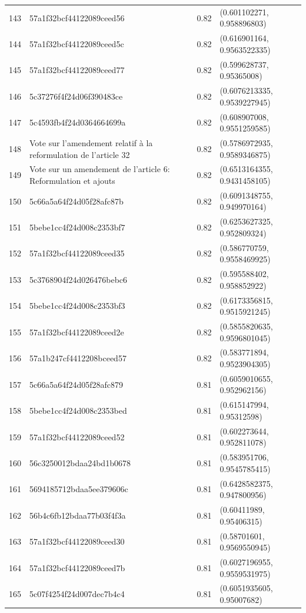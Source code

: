 \begin{table}[ht]
\begin{tabular}{rlrl}
  143 & 57a1f32bcf44122089ceed56 & 0.82 & (0.601102271, 0.958896803) \\ 
  144 & 57a1f32bcf44122089ceed5c & 0.82 & (0.616901164, 0.9563522335) \\ 
  145 & 57a1f32bcf44122089ceed77 & 0.82 & (0.599628737, 0.95365008) \\ 
  146 & 5c37276f4f24d06f390483ce & 0.82 & (0.6076213335, 0.9539227945) \\ 
  147 & 5c4593fb4f24d0364664699a & 0.82 & (0.608907008, 0.9551259585) \\ 
  148 & Vote sur l'amendement relatif à la reformulation de l'article 32 & 0.82 & (0.5786972935, 0.9589346875) \\ 
  149 & Vote sur un amendement de l'article 6: Reformulation et ajouts & 0.82 & (0.6513164355, 0.9431458105) \\ 
  150 & 5c66a5a64f24d05f28afc87b & 0.82 & (0.6091348755, 0.949970164) \\ 
  151 & 5bebe1cc4f24d008c2353bf7 & 0.82 & (0.6253627325, 0.952809324) \\ 
  152 & 57a1f32bcf44122089ceed35 & 0.82 & (0.586770759, 0.9558469925) \\ 
  153 & 5c3768904f24d026476bebc6 & 0.82 & (0.595588402, 0.958852922) \\ 
  154 & 5bebe1cc4f24d008c2353bf3 & 0.82 & (0.6173356815, 0.9515921245) \\ 
  155 & 57a1f32bcf44122089ceed2e & 0.82 & (0.5855820635, 0.9596801045) \\ 
  156 & 57a1b247cf4412208bceed57 & 0.82 & (0.583771894, 0.9523904305) \\ 
  157 & 5c66a5a64f24d05f28afc879 & 0.81 & (0.6059010655, 0.952962156) \\ 
  158 & 5bebe1cc4f24d008c2353bed & 0.81 & (0.615147994, 0.95312598) \\ 
  159 & 57a1f32bcf44122089ceed52 & 0.81 & (0.602273644, 0.952811078) \\ 
  160 & 56c3250012bdaa24bd1b0678 & 0.81 & (0.583951706, 0.9545785415) \\ 
  161 & 5694185712bdaa5ee379606c & 0.81 & (0.6428582375, 0.947800956) \\ 
  162 & 56b4c6fb12bdaa77b03f4f3a & 0.81 & (0.60411989, 0.95406315) \\ 
  163 & 57a1f32bcf44122089ceed30 & 0.81 & (0.58701601, 0.9569550945) \\ 
  164 & 57a1f32bcf44122089ceed7b & 0.81 & (0.6027196955, 0.9559531975) \\ 
  165 & 5c07f4254f24d007dec7b4c4 & 0.81 & (0.6051935605, 0.95007682) \\ 

\end{tabular}
\end{table}
